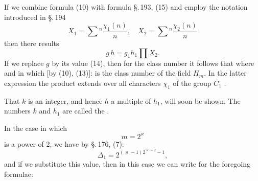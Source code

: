 
If we combine formula (10) with formula \S.\,193, (15) and employ the notation introduced in \S.\,194
\[
X_1 = \sum{}^n \frac{\chi_1(n)}{n}, \quad X_2 = \sum{}^n \frac{\chi_2(n)}{n}
\]
then there results
\[
g\,h = g_1 h_1 \prod X_2.
\]
If we replace $g$ by its value (14), then for the class number it follows that
where
and in which [by (10), (13)]:
is the class number of the field $H_m$. In the latter expression the product extends over all characters $\chi_1$ of the group $C_1$ .

That $k$ is an integer, and hence $h$ a multiple of $h_1$, will soon be shown. The numbers $k$ and $h_1$ are called the .

In the case in which
\[
m = 2^\varkappa
\]
is a power of 2, we have by \S.\,176, (7):
\[
\varDelta_1 = 2^{(\varkappa-1)2^{\varkappa-2}-1},
\]
and if we substitute this value, then in this case we can write for the foregoing formulae:

